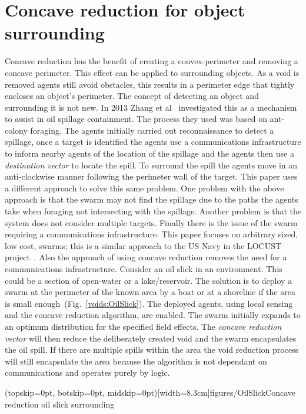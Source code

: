 \documentclass{ieeeaccess}
\begin{document}
\section{Concave reduction for object surrounding}\label{voids:ObjectSurrounding}
Concave reduction has the benefit of creating a convex-perimeter and removing a concave perimeter. This effect can be applied to surrounding objects. As a void is removed agents still avoid obstacles, this results in a perimeter edge that tightly encloses an object's perimeter. The concept of detecting an object and surrounding it is not new. In 2013 Zhang et al~\cite{ZFG:13} investigated this as a mechanism to assist in oil spillage containment. The process they used was based on ant-colony foraging. The agents initially carried out reconnaissance to detect a spillage, once a target is identified the agents use a communications infrastructure to inform nearby agents of the location of the spillage and the agents then use a \textit{destination vector} to locate the spill. To surround the spill the agents move in an anti-clockwise manner following the perimeter wall of the target. This paper uses a different approach to solve this same problem.
One problem with the above approach is that the swarm may not find the spillage due to the paths the agents take when foraging not intersecting with the spillage. Another problem is that the system does not consider multiple targets. Finally there is the issue of the swarm requiring a communications infrastructure. 
This paper focuses on arbitrary sized, low cost, swarms; this is a similar approach to the US Navy in the LOCUST project~\cite{MW:15, DS:15}. Also the approach of using concave reduction removes the need for a communications infrastructure. 
Consider an oil slick in an environment. This could be a section of open-water or a lake/reservoir. The solution is to deploy a swarm at the perimeter of the known area by a boat or at a shoreline if the area is small enough~(Fig.~\ref{voids:OilSlick}). The deployed agents, using local sensing and the concave reduction algorithm, are enabled. The swarm initially expands to an optimum distribution for the specified field effects. The \textit{concave reduction vector} will then reduce the deliberately created void and the swarm encapsulates the oil spill. If there are multiple spills within the area the void reduction process will still encapsulate the area because the algorithm is not dependant on communications and operates purely by logic.  

\Figure[t!](topskip=0pt, botskip=0pt, midskip=0pt)[width=8.3cm]{figures/OilSlick}{Concave reduction oil slick surrounding\label{voids:OilSlick}}
\end{document}
